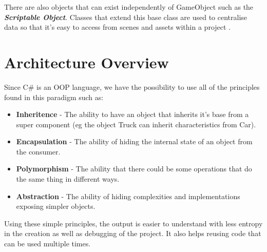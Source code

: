
There are also objects that can exist independently of GameObject such as the \textbf{\textit{Scriptable Object}}. Classes that extend this base class are used to centralise data so that it's easy to access from scenes and assets within a project \cite{unityDocScriptableObj}.



\newpage

\section{Architecture Overview}
Since C\# is an OOP language, we have the possibility to use all of the principles found in this paradigm such as:

\begin{itemize}
    \item \textbf{Inheritence} - The ability to have an object that inherits it's base from a super component (eg the object Truck can inherit characteristics from Car).
    \item \textbf{Encapsulation} - The ability of hiding the internal state of an object from the consumer.
    \item \textbf{Polymorphism} - The ability that there could be some operations that do the same thing in different ways.
    \item \textbf{Abstraction} - The ability of hiding complexities and implementations exposing simpler objects.
\end{itemize}

Using these simple principles, the output is easier to understand with less entropy in the creation as well as debugging of the project. It also helps reusing code that can be used multiple times.

